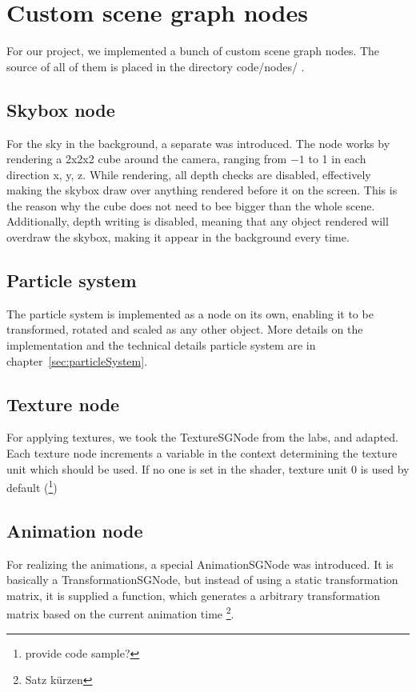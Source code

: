\section{Custom scene graph nodes} \label{sec:customSGNodes}

For our project, we implemented a bunch of custom scene graph nodes.
The source of all of them is placed in the directory code/nodes/ .

\subsection*{Skybox node} \label{subsec:skyboxNode}
For the sky in the background, a separate  was introduced.
The node works by rendering a 2x2x2 cube around the camera, ranging from $-1$ to 1 in each direction x, y, z.
While rendering, all depth checks are disabled, effectively making the skybox draw over anything rendered before it on the screen.
This is the reason why the cube does not need to bee bigger than the whole scene.
Additionally, depth writing is disabled, meaning that any object rendered will overdraw the skybox, making it appear in the background every time.

\subsection*{Particle system} \label{subsec:particleSystemNode}
The particle system is implemented as a node on its own, enabling it to be transformed, rotated and scaled as any other object.
More details on the implementation and the technical details particle system are in chapter~\ref{sec:particleSystem}.

\subsection*{Texture node} \label{subsec:textureNode}
For applying textures, we took the TextureSGNode from the labs, and adapted.
Each texture node increments a variable in the context determining the texture unit which should be used.
If no one is set in the shader, texture unit 0 is used by default (\footnote{provide code sample?})

\subsection*{Animation node} \label{subsec:animationNode}
For realizing the animations, a special AnimationSGNode was introduced.
It is basically a TransformationSGNode, but instead of using a static transformation matrix,
it is supplied a function, which generates a arbitrary transformation matrix based on the
current animation time \footnote{Satz k\"urzen}.

